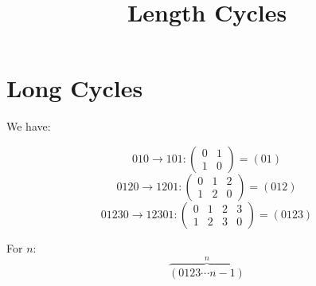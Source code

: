\documentclass[a4paper,10pt]{article}
\title{Length Cycles}
\author{}
\begin{document}
\maketitle



\section{Long Cycles}
We have:

\begin{equation}
010\rightarrow101:\begin{pmatrix}
0&1\\
1&0
\end{pmatrix} = (01)
\end{equation}
\begin{equation}
0120\rightarrow1201:\begin{pmatrix}
0&1&2\\
1&2&0
\end{pmatrix} = (012)
\end{equation}
\begin{equation}
01230\rightarrow12301:\begin{pmatrix}
0&1&2&3\\
1&2&3&0
\end{pmatrix} = (0123)
\end{equation}

For $n$:
\begin{equation}
\overbrace{(0123\cdots n-1)}^n 
\end{equation}
\end{document}
